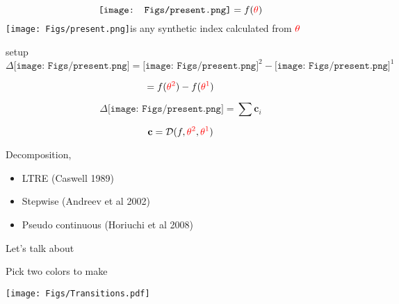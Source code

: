\documentclass[20pt,usenames,dvipsnames]{beamer}
\newcommand{\presentpic}{\texttt{[image: Figs/present.png]}}
\begin{document}

\begin{frame}[plain]
\Large
$$\presentpic = f(\color{red}\theta \color{black})$$
\vspace{1em}
 \presentpic \enspace is any synthetic index calculated from $\color{red}\theta$
 
\end{frame}


\begin{frame}[plain]{setup}
\Large
$$ \Delta\presentpic = \presentpic^2 - \presentpic^1$$

$$ = f(\color{red}{\theta^2} \color{black}) - f(\color{red}{\theta^1} \color{black})$$

$$ \Delta\presentpic = \sum \mathbf{c}_i$$

$$ \mathbf{c} = \mathcal{D}(f, \color{red}{\theta^2}\color{black},\color{red}{\theta^1}\color{black})$$
\end{frame}


\begin{frame}[plain]{Decomposition, }
\begin{itemize}
\item LTRE (Caswell 1989)
\item Stepwise (Andreev et al 2002)
\item Pseudo continuous (Horiuchi et al 2008)
\end{itemize}

\end{frame}


\begin{frame}[plain]

\Huge
\centering
Let's talk about \scalebox{2}{\color{red}$\theta$}

\end{frame}


\begin{frame}[plain]

\Large
Pick two colors to make \scalebox{1.5}{\color{red}$\theta$}

\begin{center}
\texttt{[image: Figs/Transitions.pdf]}
\end{center}
\end{frame}
\end{document}
